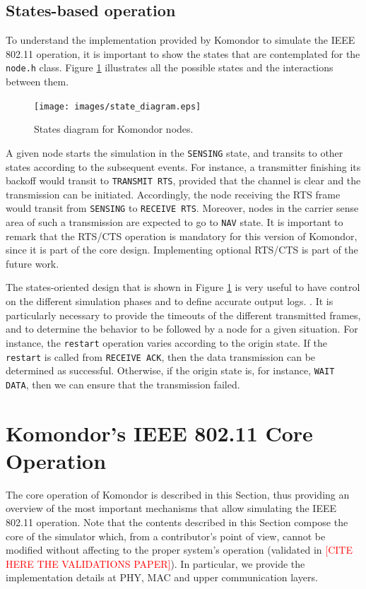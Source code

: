 \documentclass[a4paper]{article}
\begin{document}
\subsection{States-based operation}
\label{section:states}
To understand the implementation provided by Komondor to simulate the IEEE 802.11 operation, it is important to show the states that are contemplated for the \texttt{node.h} class. Figure \ref{fig:state_diagram} illustrates all the possible states and the interactions between them.

\begin{figure}[h]
	\centering
	\texttt{[image: images/state\_diagram.eps]}
	\caption{States diagram for Komondor nodes.}    
	\label{fig:state_diagram}
\end{figure}

A given node starts the simulation in the \texttt{SENSING} state, and transits to other states according to the subsequent events. For instance, a transmitter finishing its backoff would transit to \texttt{TRANSMIT RTS}, provided that the channel is clear and the transmission can be initiated. Accordingly, the node receiving the RTS frame would transit from \texttt{SENSING} to \texttt{RECEIVE RTS}. Moreover, nodes in the carrier sense area of such a transmission are expected to go to \texttt{NAV} state. It is important to remark that the RTS/CTS operation is mandatory for this version of Komondor, since it is part of the core design. Implementing optional RTS/CTS is part of the future work.

The states-oriented design that is shown in Figure \ref{fig:state_diagram} is very useful to have control on the different simulation phases and to define accurate output logs. . It is particularly necessary to provide the timeouts of the different transmitted frames, and to determine the behavior to be followed by a node for a given situation. For instance, the \texttt{restart} operation varies according to the origin state. If the \texttt{restart} is called from \texttt{RECEIVE ACK}, then the data transmission can be determined as successful. Otherwise, if the origin state is, for instance, \texttt{WAIT DATA}, then we can ensure that the transmission failed.

\section{Komondor's IEEE 802.11 Core Operation}
\label{section:core_operation}
The core operation of Komondor is described in this Section, thus providing an overview of the most important mechanisms that allow simulating the IEEE 802.11 operation. Note that the contents described in this Section compose the core of the simulator which, from a contributor's point of view, cannot be modified without affecting to the proper system's operation (validated in \textcolor{red}{[CITE HERE THE VALIDATIONS PAPER]}). In particular, we provide the implementation details at PHY,  MAC and upper communication layers.
\end{document}
